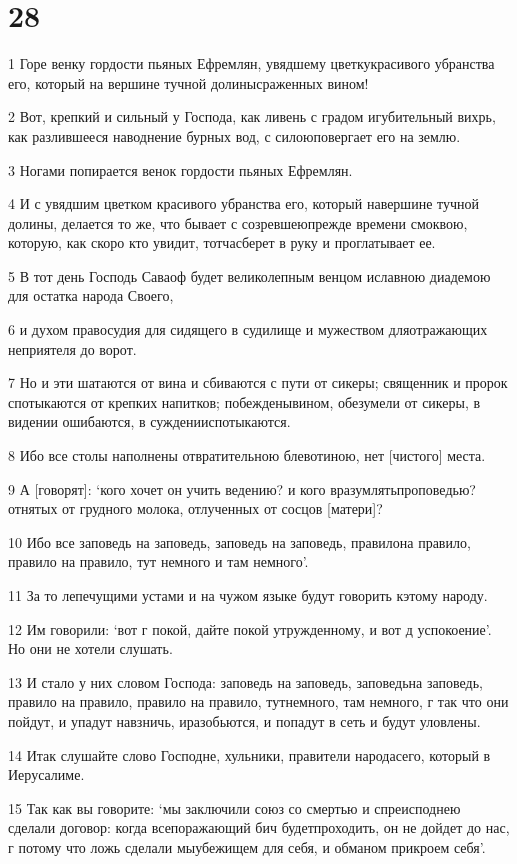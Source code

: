 \chapter{28}

\par 1 Горе венку гордости пьяных Ефремлян, увядшему цветкукрасивого убранства его, который на вершине тучной долинысраженных вином!
\par 2 Вот, крепкий и сильный у Господа, как ливень с градом игубительный вихрь, как разлившееся наводнение бурных вод, с силоюповергает его на землю.
\par 3 Ногами попирается венок гордости пьяных Ефремлян.
\par 4 И с увядшим цветком красивого убранства его, который навершине тучной долины, делается то же, что бывает с созревшеюпрежде времени смоквою, которую, как скоро кто увидит, тотчасберет в руку и проглатывает ее.
\par 5 В тот день Господь Саваоф будет великолепным венцом иславною диадемою для остатка народа Своего,
\par 6 и духом правосудия для сидящего в судилище и мужеством дляотражающих неприятеля до ворот.
\par 7 Но и эти шатаются от вина и сбиваются с пути от сикеры; священник и пророк спотыкаются от крепких напитков; побежденывином, обезумели от сикеры, в видении ошибаются, в сужденииспотыкаются.
\par 8 Ибо все столы наполнены отвратительною блевотиною, нет [чистого] места.
\par 9 А [говорят]: `кого хочет он учить ведению? и кого вразумлятьпроповедью? отнятых от грудного молока, отлученных от сосцов [матери]?
\par 10 Ибо все заповедь на заповедь, заповедь на заповедь, правилона правило, правило на правило, тут немного и там немного'.
\par 11 За то лепечущими устами и на чужом языке будут говорить кэтому народу.
\par 12 Им говорили: `вот г покой, дайте покой утружденному, и вот д успокоение'. Но они не хотели слушать.
\par 13 И стало у них словом Господа: заповедь на заповедь, заповедьна заповедь, правило на правило, правило на правило, тутнемного, там немного, г так что они пойдут, и упадут навзничь, иразобьются, и попадут в сеть и будут уловлены.
\par 14 Итак слушайте слово Господне, хульники, правители народасего, который в Иерусалиме.
\par 15 Так как вы говорите: `мы заключили союз со смертью и спреисподнею сделали договор: когда всепоражающий бич будетпроходить, он не дойдет до нас, г потому что ложь сделали мыубежищем для себя, и обманом прикроем себя'.

